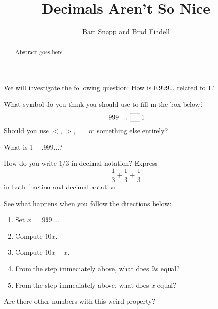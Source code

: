 \documentclass{ximera}
\title{Decimals Aren't So Nice}
\author{Bart Snapp and Brad Findell}
\begin{document}
\begin{abstract}
Abstract goes here.  
\end{abstract}
\maketitle

\label{A:DecNotNice}


We will investigate the following question: How is $0.999\dots$
related to $1$?



\begin{problem}
What symbol do you think you should use to fill in the box below?
\[
.999\dots \,\fbox{\rule[0mm]{0mm}{2mm}\hspace{2ex}}\, 1
\]
Should you use $<$, $>$, $=$ or something else entirely?
\end{problem}


\begin{problem}
What is $1 - .999\dots$?
\end{problem}

\begin{problem}
How do you write $1/3$ in decimal notation? Express
\[
\frac{1}{3} + \frac{1}{3} + \frac{1}{3}
\]
in both fraction and decimal notation.
\end{problem}

\begin{problem}
See what happens when you follow the directions below:
\begin{enumerate}
\item Set $x = .999\dots$.
\item Compute $10x$. 
\item Compute $10x-x$.
\item From the step immediately above, what does $9x$ equal?
\item From the step immediately above, what does $x$ equal?
\end{enumerate}
\end{problem}

\begin{problem}
Are there other numbers with this weird property?
\end{problem}
\end{document}
